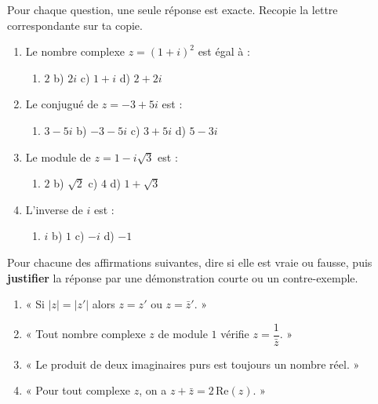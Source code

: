 \documentclass[11pt]{article}
\begin{document}
\begin{exercice}
Pour chaque question, une seule réponse est exacte. Recopie la lettre correspondante sur ta copie.
\begin{enumerate}
\item Le nombre complexe $z = (1+i)^2$ est égal à :
\begin{enumerate}
\item[a)] $2$ \quad b) $2i$ \quad c) $1+i$ \quad d) $2+2i$
\end{enumerate}
\item Le conjugué de $z = -3+5i$ est :
\begin{enumerate}
\item[a)] $3-5i$ \quad b) $-3-5i$ \quad c) $3+5i$ \quad d) $5-3i$
\end{enumerate}
\item Le module de $z = 1-i\sqrt{3}$ est :
\begin{enumerate}
\item[a)] $2$ \quad b) $\sqrt{2}$ \quad c) $4$ \quad d) $1+\sqrt{3}$
\end{enumerate}
\item L'inverse de $i$ est :
\begin{enumerate}
\item[a)] $i$ \quad b) $1$ \quad c) $-i$ \quad d) $-1$
\end{enumerate}
\end{enumerate}
\end{exercice}

\begin{exercice}
Pour chacune des affirmations suivantes, dire si elle est vraie ou fausse, puis \textbf{justifier} la réponse par une démonstration courte ou un contre-exemple.
\begin{enumerate}
\item « Si $|z| = |z'|$ alors $z = z'$ ou $z = \bar{z}'$. »
\item « Tout nombre complexe $z$ de module $1$ vérifie $z = \dfrac{1}{\bar{z}}$. »
\item « Le produit de deux imaginaires purs est toujours un nombre réel. »
\item « Pour tout complexe $z$, on a $z + \bar{z} = 2\,\mathrm{Re}(z)$. »
\end{enumerate}
\end{exercice}
\end{document}
